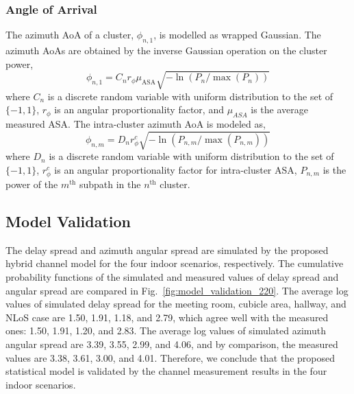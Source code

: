 \documentclass[journal,12pt,draftclsnofoot,onecolumn]{IEEEtran}
\begin{document}
\subsubsection{Angle of Arrival}
The azimuth AoA of a cluster, $\phi_{n,1}$, is modelled as wrapped Gaussian. The azimuth AoAs are obtained by the inverse Gaussian operation on the cluster power,
\begin{equation}
    \phi_{n,1}=C_n r_\phi\mu_ \mathrm{ASA}\sqrt{-\ln(P_n/\max(P_n))}
\end{equation}
where $C_n$ is a discrete random variable with uniform distribution to the set of $\{-1,1\}$, $r_\phi$ is an angular proportionality factor, and $\mu_{ASA}$ is the average measured ASA. The intra-cluster azimuth AoA is modeled as,
\begin{equation}
    \phi_{n,m}=D_n r^{c}_\phi\sqrt{-\ln(P_{n,m}/\max(P_{n,m}))}
\end{equation}
where $D_n$ is a discrete random variable with uniform distribution to the set of $\{-1,1\}$, $r^c_\phi$ is an angular proportionality factor for intra-cluster ASA, $P_{n,m}$ is the power of the $m^\text{th}$ subpath in the $n^\text{th}$ cluster.

\subsection{Model Validation}
The delay spread and azimuth angular spread are simulated by the proposed hybrid channel model for the four indoor scenarios, respectively. The cumulative probability functions of the simulated and measured values of delay spread and angular spread are compared in Fig.~\ref{fig:model_validation_220}. The average log values of simulated delay spread for the meeting room, cubicle area, hallway, and NLoS case are 1.50, 1.91, 1.18, and 2.79, which agree well with the measured ones: 1.50, 1.91, 1.20, and 2.83. The average log values of simulated azimuth angular spread are 3.39, 3.55, 2.99, and 4.06, and by comparison, the measured values are 3.38, 3.61, 3.00, and 4.01. Therefore, we conclude that the proposed statistical model is validated by the channel measurement results in the four indoor scenarios. 
\end{document}

